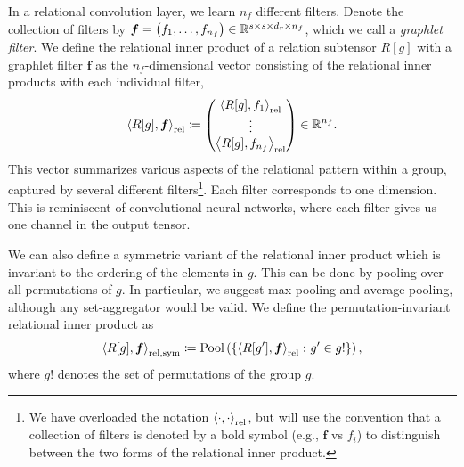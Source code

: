 In a relational convolution layer, we learn $n_f$ different filters. Denote the collection of filters by $\boldsymbol{f} = \left(f_1, \ldots, f_{n_f}\right) \in \mathbb{R}^{s \times s \times d_r \times n_f}$, which we call a \textit{graphlet filter}. We define the relational inner product of a relation subtensor $R[g]$ with a graphlet filter $\bm{f}$ as the $n_f$-dimensional vector consisting of the relational inner products with each individual filter,
\begin{equation}
    \label{eq:relational_inner_prod}
    \left\langle R[g], \bm{f} \right\rangle_\mathrm{rel} \coloneq \begin{pmatrix} \left\langle R[g], f_1 \right\rangle_\mathrm{rel} \\ \vdots 
 \\ \left\langle R[g], f_{n_f} \right\rangle_\mathrm{rel} \end{pmatrix} \in \mathbb{R}^{n_f}.
\end{equation}
This vector summarizes various aspects of the relational pattern within a group, captured by several different filters\footnote{We have overloaded the notation $\left\langle \cdot, \cdot \right\rangle_\mathrm{rel}$, but will use the convention that a collection of filters is denoted by a bold symbol (e.g., $\bm{f}$ vs $f_i$) to distinguish between the two forms of the relational inner product.}. Each filter corresponds to one dimension. This is reminiscent of convolutional neural networks, where each filter gives us one channel in the output tensor.

We can also define a symmetric variant of the relational inner product which is invariant to the ordering of the elements in $g$. This can be done by pooling over all permutations of $g$. In particular, we suggest max-pooling and average-pooling, although any set-aggregator would be valid. We define the permutation-invariant relational inner product as
\begin{equation}\label{eq:symmetric_relational_inner_prod}
    \left \langle R[g], \bm{f} \right\rangle_{\mathrm{rel}, \mathrm{sym}} \coloneq \mathrm{Pool}\left(\left\{\left\langle R[g'], \bm{f} \right\rangle_\mathrm{rel} \colon g' \in g!\right\}\right),
\end{equation}
where $g!$ denotes the set of permutations of the group $g$.

